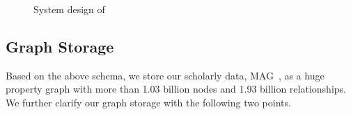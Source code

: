 \begin{figure}
\centering
{}
\vspace{-1ex}
\caption{System design of \oursystem}
\label{fig:system}
\vspace{-2ex}
\end{figure}


\subsection{Graph Storage} \label{subsec:storage}


Based on the above schema, we store our scholarly data, \ie MAG~\cite{sinha2015overview}, as a huge property graph with more than 1.03 billion nodes and 1.93 billion relationships. We further clarify our graph storage with the following two points.


